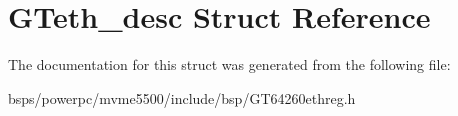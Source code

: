 \hypertarget{structGTeth__desc}{}\section{G\+Teth\+\_\+desc Struct Reference}
\label{structGTeth__desc}


The documentation for this struct was generated from the following file\+:\begin{DoxyCompactItemize}
\item 
bsps/powerpc/mvme5500/include/bsp/G\+T64260ethreg.\+h\end{DoxyCompactItemize}
